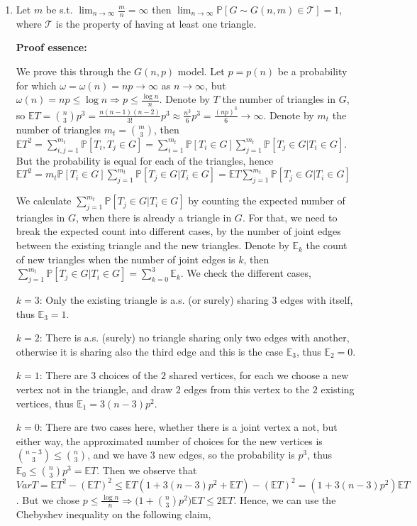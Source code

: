 \documentclass{article}
\begin{document}
\begin{enumerate}
    \item Let $m$ be s.t. $\lim_{n\rightarrow\infty}\frac{m}{n}=\infty$ then $\lim_{n\rightarrow\infty}\mathbb{P}[G\sim{G(n,m)}\in\mathcal{T}]=1$, where $\mathcal{T}$ is the property of having at least one triangle.

    \textbf{Proof essence:}

    We prove this through the $G(n,p)$ model. Let $p=p(n)$ be a probability for which $\omega=\omega(n)=np\rightarrow\infty$ as $n\rightarrow\infty$, but $\omega(n)=np\leq{\log{n}}\Rightarrow{p\leq\frac{\log{n}}{n}}$. Denote by $T$ the number of triangles in $G$, so $\mathbb{E}T=\binom{n}{3}p^3=\frac{n(n-1)(n-2)}{3!}p^3\approx\frac{n^3}{6}p^3=\frac{(np)^3}{6}\rightarrow\infty$. Denote by $m_t$ the number of triangles $m_t=\binom{m}{3}$, then $\mathbb{E}T^2=\sum_{i,j=1}^{m_t}\mathbb{P}[T_i,T_j\in{G}]=\sum_{i=1}^{m_t}\mathbb{P}[T_i\in{G}]\sum_{j=1}^{m_t}\mathbb{P}[T_j\in{G}|T_i\in{G}]$. But the probability is equal for each of the triangles, hence $\mathbb{E}T^2=m_t\mathbb{P}[T_i\in{G}]\sum_{j=1}^{m_t}\mathbb{P}[T_j\in{G}|T_i\in{G}]=\mathbb{E}T\sum_{j=1}^{m_t}\mathbb{P}[T_j\in{G}|T_i\in{G}]$

We calculate $\sum_{j=1}^{m_t}\mathbb{P}[T_j\in{G}|T_i\in{G}]$ by counting the expected number of triangles in $G$, when there is already a triangle in $G$. For that, we need to break the expected count into different cases, by the number of joint edges between the existing triangle and the new triangles. Denote by $\mathbb{E}_k$ the count of new triangles when the number of joint edges is $k$, then $\sum_{j=1}^{m_t}\mathbb{P}[T_j\in{G}|T_i\in{G}]=\sum_{k=0}^3\mathbb{E}_k$.
We check the different cases,

$k=3$: Only the existing triangle is a.s. (or surely) sharing $3$ edges with itself, thus $\mathbb{E}_3=1$.

$k=2$: There is a.s. (surely) no triangle sharing only two edges with another, otherwise it is sharing also the third edge and this is the case $\mathbb{E}_3$, thus $\mathbb{E}_2=0$.

$k=1$: There are $3$ choices of the $2$ shared vertices, for each we choose a new vertex not in the triangle, and draw $2$ edges from this vertex to the $2$ existing vertices, thus $\mathbb{E}_{1}=3(n-3)p^2$.

$k=0$: There are two cases here, whether there is a joint vertex a not, but either way, the approximated number of choices for the new vertices is $\binom{n-3}{3}\leq\binom{n}{3}$, and we have $3$ new edges, so the probability is $p^3$, thus $\mathbb{E}_0\leq\binom{n}{3}p^3=\mathbb{E}T$. Then we observe that $Var{T}=\mathbb{E}T^2-(\mathbb{E}T)^2\leq\mathbb{E}T(1+3(n-3)p^2+\mathbb{E}T)-(\mathbb{E}T)^2=(1+3(n-3)p^2)\mathbb{E}T$. But we chose $p\leq{\frac{\log{n}}{n}}\Rightarrow{(1+\binom{n}{3}p^2})\mathbb{E}T\leq{2\mathbb{E}T}$. Hence, we can use the Chebyshev inequality on the following claim,


\end{enumerate}
\end{document}

